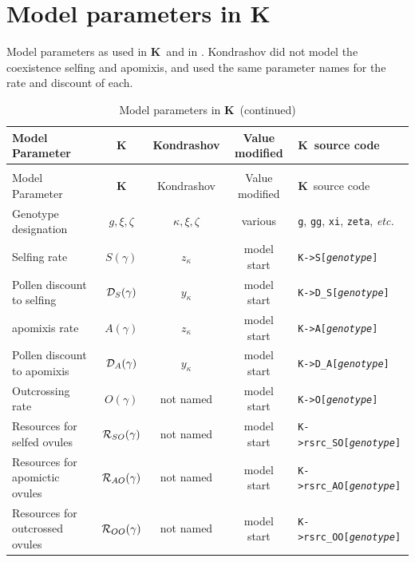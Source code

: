 \documentclass[10pt,twoside,a4paper,fleqn]{report}
\numberwithin{equation}{section}  %
\newcommand{\K}{{\bf K}}
\newcommand{\Kmemberi}[2]{\mbox{{\tt K->#1[{\it #2}\/]}}}
\newcommand{\Sg}{\mbox{$S(\gamma)$}}
\newcommand{\DSg}{\mbox{${\cal D}_{S}(\gamma)$}}
\newcommand{\Ag}{\mbox{$A(\gamma)$}}
\newcommand{\DAg}{\mbox{${\cal D}_{A}(\gamma)$}}
\newcommand{\Og}{\mbox{$O(\gamma)$}}
\newcommand{\RSOg}{\mbox{${\cal R}_{SO}(\gamma)$}}
\newcommand{\RAOg}{\mbox{${\cal R}_{AO}(\gamma)$}}
\newcommand{\ROOg}{\mbox{${\cal R}_{OO}(\gamma)$}}
\begin{document}
{%
\chapter{Model parameters in \K}

Model parameters as used in \K\ and in \citet{Kondrashov:1985:5375}.  \dag\/Kondrashov did not model the coexistence selfing and apomixis, and used the same parameter names for the rate and discount of each.

\begin{landscape}

\label{tab:modelparameters}
\begin{longtable}{p{2in}|c|c|c|l}
\caption{Model parameters in \K} \\
Model Parameter			        &	\K              	&	Kondrashov		& Value modified & \K\ source code       \\ \hline
\endfirsthead
\caption{Model parameters in \K\ (continued)} \\
Model Parameter			        &	\K              	&	Kondrashov		& Value modified & \K\ source code       \\ \hline
\endhead
Genotype designation	      & $g, \xi, \zeta$	& $\kappa, \xi, \zeta$	& various & {\tt g}, {\tt gg}, {\tt xi}, {\tt zeta}, {\em etc.} \\
Selfing rate								& \Sg							& $z_\kappa$		& model start &	\Kmemberi{S}{genotype}   \\
Pollen discount to selfing	& \DSg						& $y_\kappa$		& model start &  \Kmemberi{D\_S}{genotype} \\
apomixis rate								& \Ag							& $z_\kappa$\dag 	&	model start & \Kmemberi{A}{genotype}   \\
Pollen discount to apomixis	& \DAg						& $y_\kappa$\dag	& model start & \Kmemberi{D\_A}{genotype} \\
Outcrossing rate						& \Og							& not named   	&	model start &	\Kmemberi{O}{genotype} \\
Resources for selfed ovules & \RSOg           & not named			& model start &	\Kmemberi{rsrc\_SO}{genotype} \\
Resources for apomictic ovules & \RAOg        & not named			& model start &	\Kmemberi{rsrc\_AO}{genotype} \\
Resources for outcrossed ovules & \ROOg       & not named			& model start &	\Kmemberi{rsrc\_OO}{genotype} \\

\end{longtable}
\end{landscape}}
\end{document}
